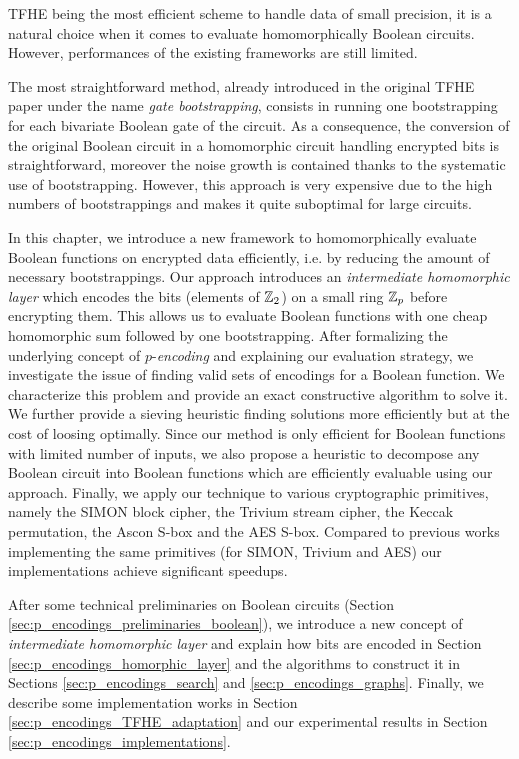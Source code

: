

TFHE being the most efficient scheme to handle data of small precision, it is a natural choice when it comes to evaluate homomorphically Boolean circuits. However, performances of the existing frameworks are still limited. 

The most straightforward method, already introduced in the original TFHE paper \cite{JC:CGGI20} under the name \emph{gate bootstrapping}, consists in running one bootstrapping for each bivariate Boolean gate of the circuit. As a consequence, the conversion of the original Boolean circuit in a homomorphic circuit handling encrypted bits is straightforward, moreover the noise growth is contained thanks to the systematic use of bootstrapping. However, this approach is very expensive due to the high numbers of bootstrappings and makes it quite suboptimal for large circuits.


In this chapter, we introduce a new framework to homomorphically evaluate Boolean functions on encrypted data efficiently, i.e. by reducing the amount of necessary bootstrappings. Our approach introduces an \emph{intermediate homomorphic layer} which encodes the bits (elements of $\mathbb{Z}_2$) on a small ring $\mathbb{Z}_p$ before encrypting them. This allows us to evaluate Boolean functions with one cheap homomorphic sum followed by one bootstrapping. After formalizing the underlying concept of $p$-\emph{encoding} and explaining our evaluation strategy, we investigate the issue of finding valid sets of encodings for a Boolean function. We characterize this problem and provide an exact constructive algorithm to solve it. We further provide a sieving heuristic finding solutions more efficiently but at the cost of loosing optimally. Since our method is only efficient for Boolean functions with limited number of inputs, we also propose a heuristic to decompose any Boolean circuit into Boolean functions which are efficiently evaluable using our approach. Finally, we apply our technique to various cryptographic primitives, namely the SIMON block cipher, the Trivium stream cipher, the Keccak permutation, the Ascon S-box and the AES S-box. Compared to previous works implementing the same primitives (for SIMON, Trivium and AES) our implementations achieve significant speedups.

After some technical preliminaries on Boolean circuits (Section \ref{sec:p_encodings_preliminaries_boolean}), we introduce a new concept of \emph{intermediate homomorphic layer} and explain how bits are encoded  in Section \ref{sec:p_encodings_homorphic_layer} and the algorithms to construct it in Sections \ref{sec:p_encodings_search} and \ref{sec:p_encodings_graphs}. Finally, we describe some implementation works in Section \ref{sec:p_encodings_TFHE_adaptation} and our experimental results in Section \ref{sec:p_encodings_implementations}.










